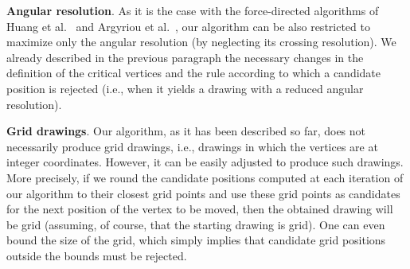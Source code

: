 \documentclass[runningheads]{llncs}
\newcommand{\myparagraph}[1]{\smallskip\noindent\textbf{#1}.}
\begin{document}
\myparagraph{Angular resolution} 
%  
As it is the case with the force-directed algorithms of Huang et al.~\cite{DBLP:journals/vlc/HuangEHL13} and Argyriou et al.~\cite{DBLP:journals/cj/ArgyriouBS13}, our algorithm can be also restricted to maximize only the angular resolution (by neglecting its crossing resolution). We already described in the previous paragraph the necessary changes in the definition of the critical vertices and the rule according to which a candidate position is rejected (i.e., when it yields a drawing with a reduced angular resolution).

\myparagraph{Grid drawings}
%
Our algorithm, as it has been described so far, does not necessarily produce grid drawings, i.e., drawings in which the vertices are at integer coordinates. However, it can be easily adjusted to produce such drawings. More precisely, if we round the candidate positions computed at each iteration of our algorithm to their closest grid points and use these grid points as candidates for the next position of the vertex to be moved, then the obtained drawing will be grid (assuming, of course, that the starting drawing is grid). One can even bound the size of the grid, which simply implies that candidate grid positions outside the bounds must be rejected. 

\end{document}
